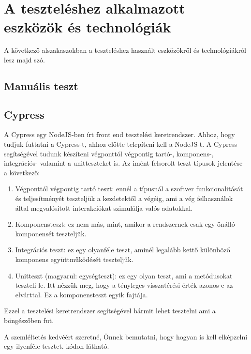 \documentclass[]{thesis-ekf}
\theoremstyle{definition}
\theoremstyle{remark}
\begin{document}
	\section{A teszteléshez alkalmazott eszközök és technológiák}
			A következő alszakaszokban a teszteléshez használt eszközökről és technológiákról lesz majd szó.
	\subsection{Manuális teszt}
		
		
	\subsection{Cypress}
		A Cypress egy NodeJS-ben írt front end tesztelési keretrendszer. Ahhoz, hogy tudjuk futtatni a Cypress-t, ahhoz előtte telepíteni kell a NodeJS-t. A Cypress segítségével tudunk készíteni végponttól végpontig tartó-, komponens-, integrációs- valamint a unitteszteket is.
		Az imént felsorolt teszt típusok jelentése a következő:
		\begin{enumerate}
			\item Végponttól végpontig tartó teszt: ennél a típusnál a szoftver funkcionalitását és teljesítményét teszteljük a kezdetektől a végéig, ami a vég felhasználok által megvalósított interakciókat szimulálja valós adatokkal.
			\item Komponensteszt: ez nem más, mint, amikor a rendszernek csak egy önálló komponensét teszteljük.
			\item Integrációs teszt: ez egy olyanféle teszt, aminél legalább kettő különböző komponens együttműködését teszteljük.
			\item Unitteszt (magyarul: egységteszt): ez egy olyan teszt, ami a metódusokat teszteli le. Itt nézzük meg, hogy a tényleges visszatérési érték azonos-e az elvárttal. Ez a komponensteszt egyik fajtája.
		\end{enumerate}
		Ezzel a tesztelési keretrendszer segítségével bármit lehet tesztelni ami a böngészőben fut.
		\cite{Cypress, Kusper Szoftvertesztles, Katalon}
		
		A szemléltetés kedvéért szeretné, Önnek bemutatni, hogy hogyan is kell elképzelni egy ilyenféle tesztet.  kódon látható.
		
		
		
\end{document}
